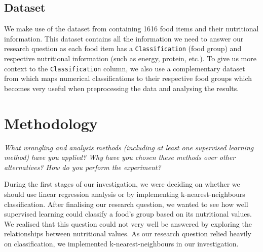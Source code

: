 \documentclass[11pt]{article}
\begin{document}



\subsection{Dataset}
We make use of the dataset from \cite{FoodStandardsAustraliaNewZealand} containing 1616 food items and their nutritional information. This dataset contains all the information we need to answer our research question as each food item has a \verb|Classification| (food group) and respective nutritional information (such as energy, protein, etc.). To give us more context to the \verb|Classification| column, we also use a complementary dataset from \cite{FoodClassification} which maps numerical classifications to their respective food groups which becomes very useful when preprocessing the data and analysing the results.

\section{Methodology}

\emph{What wrangling and analysis methods (including at least one supervised learning method) have you applied? Why have you chosen these methods over other alternatives? How do you perform the experiment?}

During the first stages of our investigation, we were deciding on whether we should use linear regression analysis or by implementing k-nearest-neighbours classification. After finalising our research question, we wanted to see how well supervised learning could classify a food’s group based on its nutritional values. We realised that this question could not very well be answered by exploring the relationships between nutritional values. As our research question relied heavily on classification, we implemented k-nearest-neighbours in our investigation.
\end{document}
